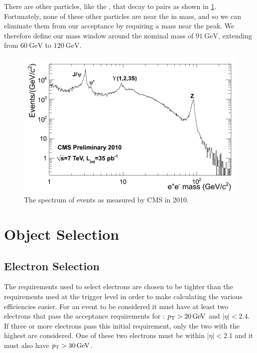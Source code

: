 There are other particles, like the \jpsi, that decay to \ee pairs as shown in
\cref{fig:ee_spectrum}. Fortunately, none of these other particles are near the
\Z in mass, and so we can eliminate them from our acceptance by requiring a
mass near the \Z peak. We therefore define our mass window around the nominal
\Z mass of $\SI{91}{\GeV}$, extending from $\SI{60}{\GeV}$ to $\SI{120}{\GeV}$.

\begin{figure}[!htbp]
    \centering
    \includegraphics[width=\textwidth]{figures/dielectron_mass_7tev.png}
    \caption{
        The spectrum of \ee events as measured by CMS in 2010.
    }
    \label{fig:ee_spectrum}
\end{figure}

\section{Object Selection}

\subsection{Electron Selection}
\label{ssec:electron_selection}

The requirements used to select electrons are chosen to be tighter than the
requirements used at the trigger level in order to make calculating the various
efficiencies easier. For an event to be considered it must have at least two
electrons that pass the acceptance requirements for \ExtendedElectrons: $\pt >
\SI{20}{\GeV}$ and $|\eta| < 2.4$. If three or more electrons pass this initial
requirement, only the two with the highest \pt are considered. One of these two
electrons must be within $|\eta| < 2.1$ and it must also have $\pt >
\SI{30}{\GeV}$.

